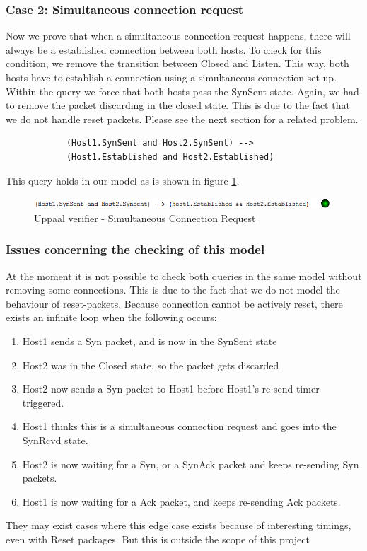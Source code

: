 \documentclass[twocolumn]{article}
\begin{document}
		\subsubsection{Case 2: Simultaneous connection request}
		Now we prove that when a simultaneous connection request happens, there will always be a established connection between both hosts. To check for this condition, we remove the transition between Closed and Listen. This way, both hosts have to establish a connection using a simultaneous connection set-up. Within the query we force that both hosts pass the SynSent state. Again, we had to remove the packet discarding in the closed state. This is due to the fact that we do not handle reset packets. Please see the next section for a related problem.
		\begin{verbatim}
			(Host1.SynSent and Host2.SynSent) -->
			(Host1.Established and Host2.Established)
		\end{verbatim}
		This query holds in our model as is shown in figure \ref{fig:verifier3}.
		\begin{figure}[h!]
			\begin{center}
				\includegraphics[width=\linewidth]{verifier-simul.png}
			\end{center}
			\caption{Uppaal verifier - Simultaneous Connection Request}
			\label{fig:verifier3}
		\end{figure}
		
		\subsubsection{Issues concerning the checking of this model}
		At the moment it is not possible to check both queries in the same model without removing some connections. This is due to the fact that we do not model the behaviour of reset-packets. Because connection cannot be actively reset, there exists an infinite loop when the following occurs:
		\begin{enumerate}
			\item Host1 sends a Syn packet, and is now in the SynSent state
			\item Host2 was in the Closed state, so the packet gets discarded
			\item Host2 now sends a Syn packet to Host1 before Host1's re-send timer triggered.
			\item Host1 thinks this is a simultaneous connection request and goes into the SynRcvd state. 
			\item Host2 is now waiting for a Syn, or a SynAck packet and keeps re-sending Syn packets.
			\item Host1 is now waiting for a Ack packet, and keeps re-sending Ack packets.
		\end{enumerate}
		They may exist cases where this edge case exists because of interesting timings, even with Reset packages. But this is outside the scope of this project
	
\end{document}
